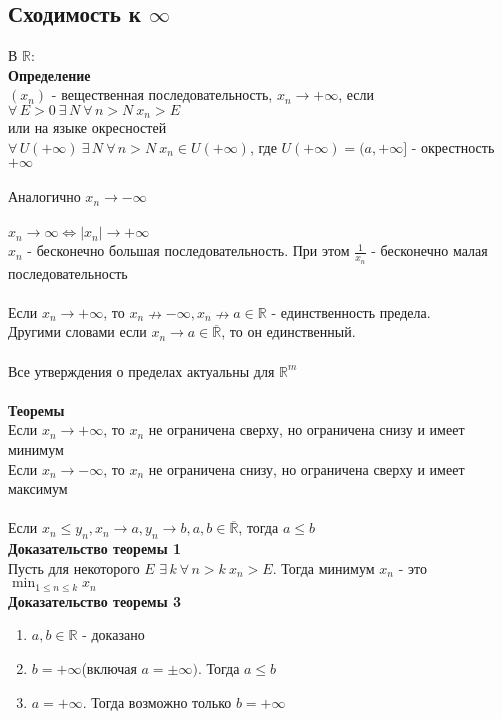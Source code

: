 \documentclass[12pt]{article}
\begin{document}
\subsection{Сходимость к $\infty$}
В $\mathbb{R}$:\\
\textbf{Определение}\\
$(x_n)$ - вещественная последовательность, $x_n \rightarrow +\infty$, если\\
$\forall\,E > 0\ \exists\, N\ \forall\,n>N\ x_n>E$\\
или на языке окресностей\\
$\forall\,U(+\infty)\ \exists\, N\ \forall\,n>N\ x_n\in U(+\infty)$, где $U(+\infty) = (a,+\infty]$ - окрестность $+\infty$\\\\
Аналогично $x_n\rightarrow -\infty$\\\\
$x_n\rightarrow \infty \Leftrightarrow |x_n| \rightarrow +\infty$\\
$x_n$ - бесконечно большая последовательность. При этом $\frac 1{x_n}$ - бесконечно малая последовательность\\\\
Если $x_n\rightarrow+\infty$, то $x_n \nrightarrow -\infty, x_n \nrightarrow a\in \mathbb{R}$ - единственность предела.\\
Другими словами если $x_n \rightarrow a \in \overline{\mathbb{R}}$, то он единственный.\\\\
Все утверждения о пределах актуальны для $\mathbb{R}^m$\\\\
\textbf{Теоремы}\\
Если $x_n\rightarrow +\infty$, то $x_n$ не ограничена сверху, но ограничена снизу и имеет минимум\\
Если $x_n\rightarrow -\infty$, то $x_n$ не ограничена снизу, но ограничена сверху и имеет максимум\\\\
Если $x_n \leq y_n, x_n \rightarrow a, y_n \rightarrow b, a,b\in \overline{\mathbb{R}}$, тогда $a\leq b$\\
\textbf{Доказательство теоремы 1}\\
Пусть для некоторого $E$ $\exists\,k\ \forall\,n>k\ x_n>E$. Тогда минимум $x_n$ - это $\min_{1\leq n \leq k} x_n$\\
\textbf{Доказательство теоремы 3}
\begin{enumerate}
    \item $a,b \in \mathbb{R}$ - доказано
    \item $b=+\infty$(включая $a=\pm\infty)$. Тогда $a\leq b$
    \item $a=+\infty$. Тогда возможно только $b = +\infty$
\end{enumerate}
\end{document}
